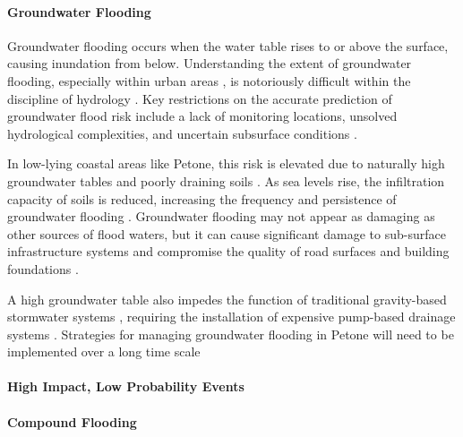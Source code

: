 \paragraph{Groundwater Flooding}
Groundwater flooding occurs when the water table rises to or above the surface,
causing inundation from below. Understanding the extent of groundwater flooding,
especially within urban areas \parencite{macdonald2011}, is notoriously
difficult within the discipline of hydrology \parencite{bosserelle2022,
abboud2018}. Key restrictions on the accurate prediction of groundwater flood
risk include a lack of monitoring locations, unsolved hydrological complexities,
and uncertain subsurface conditions \parencite{condon2021global}.

In low-lying coastal areas like Petone, this risk is elevated due to naturally
high groundwater tables and poorly draining soils \parencite{naish2024sea}. As
sea levels rise, the infiltration capacity of soils is reduced, increasing the
frequency and persistence of groundwater flooding \parencite{liu2020}.
Groundwater flooding may not appear as damaging as other sources of flood
waters, but it can cause significant damage to sub-surface infrastructure
systems and compromise the quality of road surfaces and building foundations
\parencite{mourot2022, bosserelle2022}. 

A high groundwater table also impedes the function of traditional gravity-based
stormwater systems \parencite{kool2020}, requiring the installation of expensive
pump-based drainage systems \parencite{WWL2022, lawrence2020}. Strategies for
managing groundwater flooding in Petone will need to be implemented over a long
time scale 

\paragraph{High Impact, Low Probability Events}

\paragraph{Compound Flooding}


